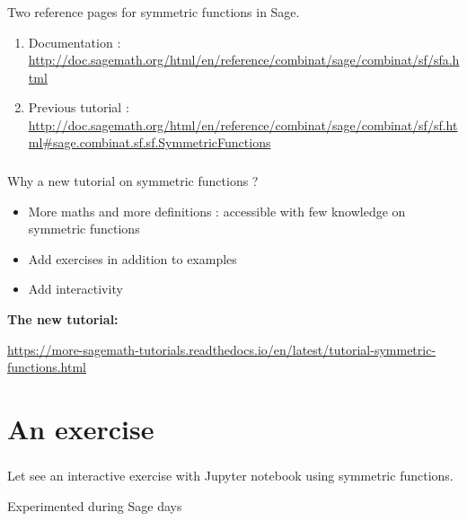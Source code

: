 \documentclass[10pt]{beamer}
\newcommand{\green}[1]{{\color[rgb]{0,0.55,0.25}{#1}}}
\newcommand{\purple}[1]{{\color[rgb]{.7,.2,1}{#1}}}
\begin{document}
\begin{frame}[fragile]\frametitle{\purple{Tutorial on Symmetric Functions}}

Two reference pages for symmetric functions in Sage. \newline 
\begin{enumerate}
	\item Documentation : \\
	\url{http://doc.sagemath.org/html/en/reference/combinat/sage/combinat/sf/sfa.html} \newline
	 
	\item Previous tutorial : \\
	\url{http://doc.sagemath.org/html/en/reference/combinat/sage/combinat/sf/sf.html#sage.combinat.sf.sf.SymmetricFunctions} \newline
\end{enumerate}

\end{frame}

\begin{frame}\frametitle{\purple{Tutorial on Symmetric Functions}}

Why a new tutorial on symmetric functions ?  \newline

\begin{itemize}
	\item More maths and more definitions : accessible with few knowledge on symmetric functions
	\item Add exercises in addition to examples
	\item Add interactivity \newline
\end{itemize}

\textbf{The new tutorial:} \newline

\centering
\url{https://more-sagemath-tutorials.readthedocs.io/en/latest/tutorial-symmetric-functions.html}

\end{frame}

\section{An exercise}

\begin{frame}\frametitle{\green{Discriminant of a polynomial using symmetric functions}}

Let see an interactive exercise with Jupyter notebook using symmetric functions. 

Experimented during Sage days

\end{frame}
\end{document}
